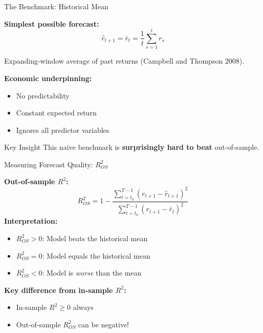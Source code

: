 \documentclass[10pt]{beamer}
\newcommand{\highlight}[1]{\textcolor{AccentOrange}{\textbf{#1}}}
\begin{document}

\begin{frame}{The Benchmark: Historical Mean}

\textbf{Simplest possible forecast:}
\[
\widehat{r}_{t+1} = \bar{r}_t = \frac{1}{t} \sum_{s=1}^{t} r_s
\]

\vspace{0.5em}
Expanding-window average of past returns (Campbell and Thompson 2008). 

\vspace{1em}
\textbf{Economic underpinning:}
\begin{itemize}
  \item No predictability
  \item Constant expected return
  \item Ignores all predictor variables
\end{itemize}

\vspace{1em}
\begin{block}{Key Insight}
This naive benchmark is \highlight{surprisingly hard to beat} out-of-sample.
\end{block}

\end{frame}


\begin{frame}{Measuring Forecast Quality: $R^2_{OS}$}

\textbf{Out-of-sample $R^2$:}
\[
R^2_{OS} = 1 - \frac{\sum_{t=t_0}^{T-1}(r_{t+1} - \widehat{r}_{t+1})^2}{\sum_{t=t_0}^{T-1}(r_{t+1} - \bar{r}_{t})^2}
\]
\textbf{Interpretation:}
\begin{itemize}
  \item $R^2_{OS} > 0$: Model beats the historical mean
  \item $R^2_{OS} = 0$: Model equals the historical mean
  \item $R^2_{OS} < 0$: Model is \emph{worse} than the mean
\end{itemize}

\vspace{1em}
\textbf{Key difference from in-sample $R^2$:}
\begin{itemize}
  \item In-sample $R^2 \geq 0$ always
  \item Out-of-sample $R^2_{OS}$ can be negative!
\end{itemize}

\end{frame}
\end{document}
